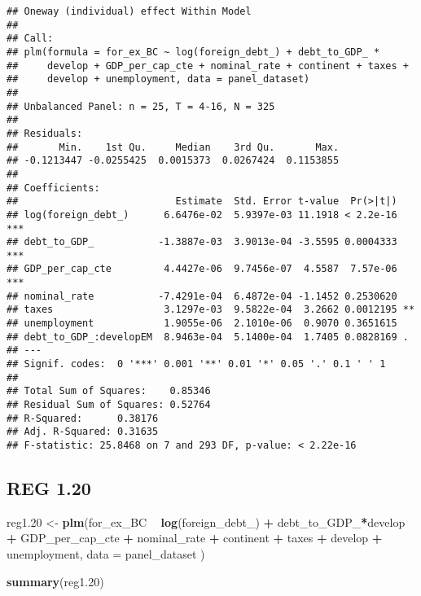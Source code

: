 \documentclass[]{article}
\newenvironment{Shaded}{\begin{snugshade}}{\end{snugshade}}
\newcommand{\KeywordTok}[1]{\textcolor[rgb]{0.13,0.29,0.53}{\textbf{#1}}}
\newcommand{\DataTypeTok}[1]{\textcolor[rgb]{0.13,0.29,0.53}{#1}}
\newcommand{\DecValTok}[1]{\textcolor[rgb]{0.00,0.00,0.81}{#1}}
\newcommand{\StringTok}[1]{\textcolor[rgb]{0.31,0.60,0.02}{#1}}
\newcommand{\OperatorTok}[1]{\textcolor[rgb]{0.81,0.36,0.00}{\textbf{#1}}}
\newcommand{\NormalTok}[1]{#1}
\begin{document}
\begin{verbatim}
## Oneway (individual) effect Within Model
## 
## Call:
## plm(formula = for_ex_BC ~ log(foreign_debt_) + debt_to_GDP_ * 
##     develop + GDP_per_cap_cte + nominal_rate + continent + taxes + 
##     develop + unemployment, data = panel_dataset)
## 
## Unbalanced Panel: n = 25, T = 4-16, N = 325
## 
## Residuals:
##       Min.    1st Qu.     Median    3rd Qu.       Max. 
## -0.1213447 -0.0255425  0.0015373  0.0267424  0.1153855 
## 
## Coefficients:
##                           Estimate  Std. Error t-value  Pr(>|t|)    
## log(foreign_debt_)      6.6476e-02  5.9397e-03 11.1918 < 2.2e-16 ***
## debt_to_GDP_           -1.3887e-03  3.9013e-04 -3.5595 0.0004333 ***
## GDP_per_cap_cte         4.4427e-06  9.7456e-07  4.5587  7.57e-06 ***
## nominal_rate           -7.4291e-04  6.4872e-04 -1.1452 0.2530620    
## taxes                   3.1297e-03  9.5822e-04  3.2662 0.0012195 ** 
## unemployment            1.9055e-06  2.1010e-06  0.9070 0.3651615    
## debt_to_GDP_:developEM  8.9463e-04  5.1400e-04  1.7405 0.0828169 .  
## ---
## Signif. codes:  0 '***' 0.001 '**' 0.01 '*' 0.05 '.' 0.1 ' ' 1
## 
## Total Sum of Squares:    0.85346
## Residual Sum of Squares: 0.52764
## R-Squared:      0.38176
## Adj. R-Squared: 0.31635
## F-statistic: 25.8468 on 7 and 293 DF, p-value: < 2.22e-16
\end{verbatim}

\subsection{REG 1.20}\label{reg-1.20-1}

\begin{Shaded}
\begin{Highlighting}[]
\NormalTok{reg1.}\DecValTok{20}\NormalTok{ <-}\StringTok{ }\KeywordTok{plm}\NormalTok{(for_ex_BC }\OperatorTok{~}\StringTok{  }\KeywordTok{log}\NormalTok{(foreign_debt_) }\OperatorTok{+}\StringTok{ }\NormalTok{debt_to_GDP_}\OperatorTok{*}\NormalTok{develop }\OperatorTok{+}\StringTok{ }\NormalTok{GDP_per_cap_cte }\OperatorTok{+}\StringTok{ }\NormalTok{nominal_rate }\OperatorTok{+}\StringTok{ }\NormalTok{continent }\OperatorTok{+}\StringTok{ }\NormalTok{taxes }\OperatorTok{+}\StringTok{ }\NormalTok{develop }\OperatorTok{+}\StringTok{ }\NormalTok{unemployment, }\DataTypeTok{data =}\NormalTok{ panel_dataset )}

\KeywordTok{summary}\NormalTok{(reg1.}\DecValTok{20}\NormalTok{)}
\end{Highlighting}
\end{Shaded}
\end{document}
